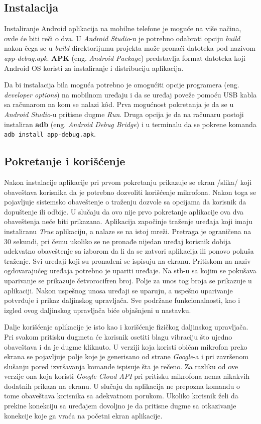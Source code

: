 \documentclass[implementacija.tex]{subfiles}
\begin{document}
\subsection{Instalacija}
Instaliranje Android aplikacija na mobilne telefone je moguće na više načina, ovde će biti reči o dva. U \textit{Android Studio}-u je potrebno odabrati opciju \textit{build} nakon čega se u \textit{build} direktorijumu projekta može pronaći datoteka pod nazivom \textit{app-debug.apk}. \textbf{APK} (eng. \textit{Android Package}) predstavlja format datoteka koji Android OS koristi za instaliranje i distribuciju aplikacija. 

Da bi instalacija bila moguća potrebno je omogućiti opcije programera (eng. \textit{developer options}) na mobilnom uređaju i da se uređaj poveže pomoću USB kabla sa računarom na kom se nalazi k\^{o}d. Prva mogućnost pokretanja je da se u \textit{Android Studio}-u pritisne dugme \textit{Run}. Druga opcija je da na računaru postoji instaliran \textbf{adb} (eng. \textit{Android Debug Bridge}) i u terminalu da se pokrene komanda \verb|adb install app-debug.apk|. 


\subsection{Pokretanje i korišćenje}
Nakon instalacije aplikacije pri prvom pokretanju prikazuje se ekran /slika/ koji obaveštava korisnika da je potrebno dozvoliti korišćenje mikrofona. Nakon toga se pojavljuje sistemsko obaveštenje o traženju dozvole sa opcijama da korisnik da dopuštenje ili odbije. U slučaju da ovo nije prvo pokretanje aplikacije ova dva obaveštenja neće biti prikazana. Aplikacija započinje traženje uređaja koji imaju instaliranu \textit{True} aplikaciju, a nalaze se na istoj mreži. Pretraga je ograničena na 30 sekundi, pri čemu ukoliko se ne pronađe nijedan uređaj korisnik dobija  adekvatno obaveštenje sa izborom da li da se zatvori aplikacija ili ponovo pokuša traženje. Svi uređaji koji su pronađeni se ispisuju na ekranu. Pritiskom na naziv ogdovarajućeg uređaja potrebno je upariti uređaje. Na stb-u sa kojim se pokušava uparivanje se prikazuje četvorocifren broj. Polje za unos tog broja se prikazuje u aplikaciji. Nakon uspešnog unosa uređaji se uparuju, a uspešno uparivanje potvrđuje i prikaz daljinskog upravljača. Sve podržane funkcionalnosti, kao i izgled ovog daljinskog upravljača biće objašnjeni u nastavku. 

Dalje korišćenje aplikacije je isto kao i korišćenje fizičkog daljinskog upravljača. Pri svakom pritisku dugmeta će korisnik osetiti blagu vibraciju što ujedno obaveštava i da je dugme kliknuto. U verziji koja koristi običan mikrofon preko ekrana se pojavljuje polje koje je generisano od strane \textit{Google}-a i pri završenom slušanju pored izvršavanja komande ispisuje šta je rečeno. Za razliku od ove verzije ona koja koristi \textit{Google Cloud API} pri pritisku mikrofona nema nikakvih dodatnih prikaza na ekranu. U slučaju da aplikacija ne prepozna komandu o tome obaveštava korisnika sa adekvatnom porukom. Ukoliko korisnik želi da prekine konekciju sa uređajem dovoljno je da pritisne dugme sa otkazivanje konekcije koje ga vraća na početni ekran aplikacije.  
\end{document}
